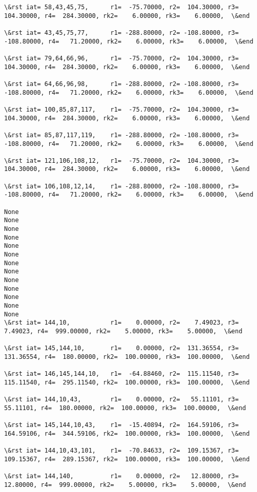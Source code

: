 \documentclass[11pt]{article}
\begin{document}
\begin{Verbatim}[commandchars=\\\{\}]
\&rst iat= 58,43,45,75,      r1=  -75.70000, r2=  104.30000, r3=  104.30000, r4=  284.30000, rk2=    6.00000, rk3=    6.00000,  \&end

\&rst iat= 43,45,75,77,      r1= -288.80000, r2= -108.80000, r3= -108.80000, r4=   71.20000, rk2=    6.00000, rk3=    6.00000,  \&end

\&rst iat= 79,64,66,96,      r1=  -75.70000, r2=  104.30000, r3=  104.30000, r4=  284.30000, rk2=    6.00000, rk3=    6.00000,  \&end

\&rst iat= 64,66,96,98,      r1= -288.80000, r2= -108.80000, r3= -108.80000, r4=   71.20000, rk2=    6.00000, rk3=    6.00000,  \&end

\&rst iat= 100,85,87,117,    r1=  -75.70000, r2=  104.30000, r3=  104.30000, r4=  284.30000, rk2=    6.00000, rk3=    6.00000,  \&end

\&rst iat= 85,87,117,119,    r1= -288.80000, r2= -108.80000, r3= -108.80000, r4=   71.20000, rk2=    6.00000, rk3=    6.00000,  \&end

\&rst iat= 121,106,108,12,   r1=  -75.70000, r2=  104.30000, r3=  104.30000, r4=  284.30000, rk2=    6.00000, rk3=    6.00000,  \&end

\&rst iat= 106,108,12,14,    r1= -288.80000, r2= -108.80000, r3= -108.80000, r4=   71.20000, rk2=    6.00000, rk3=    6.00000,  \&end

None
None
None
None
None
None
None
None
None
None
None
None
None
\&rst iat= 144,10,           r1=    0.00000, r2=    7.49023, r3=    7.49023, r4=  999.00000, rk2=    5.00000, rk3=    5.00000,  \&end

\&rst iat= 145,144,10,       r1=    0.00000, r2=  131.36554, r3=  131.36554, r4=  180.00000, rk2=  100.00000, rk3=  100.00000,  \&end

\&rst iat= 146,145,144,10,   r1=  -64.88460, r2=  115.11540, r3=  115.11540, r4=  295.11540, rk2=  100.00000, rk3=  100.00000,  \&end

\&rst iat= 144,10,43,        r1=    0.00000, r2=   55.11101, r3=   55.11101, r4=  180.00000, rk2=  100.00000, rk3=  100.00000,  \&end

\&rst iat= 145,144,10,43,    r1=  -15.40894, r2=  164.59106, r3=  164.59106, r4=  344.59106, rk2=  100.00000, rk3=  100.00000,  \&end

\&rst iat= 144,10,43,101,    r1=  -70.84633, r2=  109.15367, r3=  109.15367, r4=  289.15367, rk2=  100.00000, rk3=  100.00000,  \&end

\&rst iat= 144,140,          r1=    0.00000, r2=   12.80000, r3=   12.80000, r4=  999.00000, rk2=    5.00000, rk3=    5.00000,  \&end


\end{Verbatim}
\end{document}
